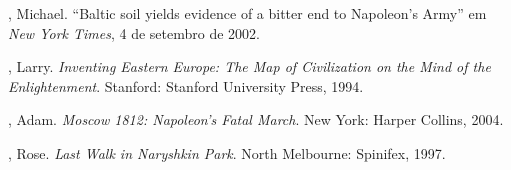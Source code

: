 \begin{bibliohedra}
, Michael. ``Baltic soil yields evidence of a bitter end to
Napoleon's Army'' em \emph{New York Times}, 4 de setembro de 2002.

, Larry. \emph{Inventing Eastern Europe: The Map of Civilization on
the Mind of the Enlightenment}. Stanford: Stanford University Press,
1994.

, Adam. \emph{Moscow 1812: Napoleon's Fatal March}. New York:
Harper Collins, 2004.

, Rose. \emph{Last Walk in Naryshkin Park}. North Melbourne:
Spinifex, 1997.
\end{bibliohedra}


